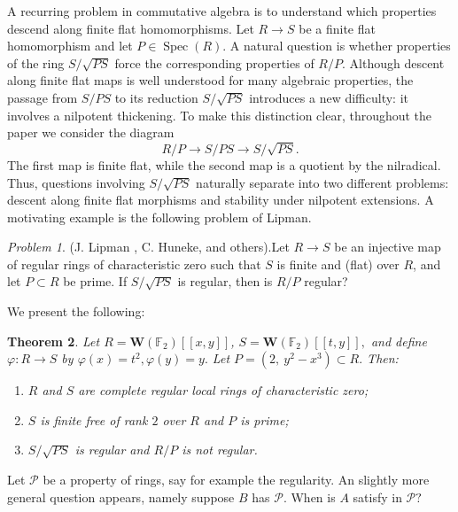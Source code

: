 \documentclass[10pt,a4paper]{amsart}
\newtheorem{theorem}{Theorem}[section]
\theoremstyle{definition}
\theoremstyle{remark}
\newtheorem{problem}[theorem]{Problem}
\begin{document}
A recurring problem in commutative algebra is to understand which
properties descend along finite flat homomorphisms.  Let
\(
R\to S
\)
be a finite flat homomorphism and let \(P\in \operatorname{Spec}(R)\).
A natural question is whether properties of the ring
\(
S/\sqrt{PS}
\)
force the corresponding properties of
\(
R/P.
\)
Although descent along finite flat maps is well understood for many
algebraic properties, the passage from \(S/PS\) to its reduction
\(S/\sqrt{PS}\) introduces a new difficulty: it involves a nilpotent
thickening.
To make this distinction clear, throughout the paper we consider the
diagram
\[
R/P \longrightarrow S/PS \longrightarrow S/\sqrt{PS}.
\]
The first map is finite flat, while the second map is a quotient by the
nilradical.  Thus, questions involving \(S/\sqrt{PS}\) naturally
separate into two different problems:
descent along finite flat morphisms and stability under nilpotent
extensions.
A motivating example is the following problem of Lipman.
\begin{problem}(J. Lipman \cite{j}, C. Huneke, and others).\label{1.1}
	Let
	\(
	R\to S
	\)
	be an injective map of regular rings of  characteristic zero such that $S$ is finite and (flat) over $R$, and let $P\subset R$ be prime. If $S/\sqrt{PS}$ is regular, then is $R/P$ regular?
\end{problem} We present the following:
\begin{theorem}\label{142}
	Let
	\(
	R=\boldsymbol{W}(\mathbb F_2)[[x,y]]\),
	\(
	S=\boldsymbol{W}(\mathbb F_2)[[t,y]],
	\)
	and define
	\(\varphi:R\to S\)
	by
	\(
	\varphi(x)=t^2, 
	\varphi(y)=y.
	\)
	Let
	\(
	P=(2,\ y^2-x^3)\subset R.
	\)
	Then:
	\begin{enumerate}
		\item \(R\) and \(S\) are complete regular local rings of characteristic zero;
		\item \(S\) is finite free of rank \(2\) over \(R\) and \(P\) is prime;

		\item
		\(
		S/\sqrt{PS}
		\)
		is regular and
		\(
		R/P
		\)
		is not regular.
	\end{enumerate}

\end{theorem}
 Let $\mathcal P$ be a property of rings, say for example the regularity.
An slightly more general question appears, namely suppose $B$   has $\mathcal P$. When is
\( A \) satisfy in
\(\mathcal P?
\)
\end{document}
